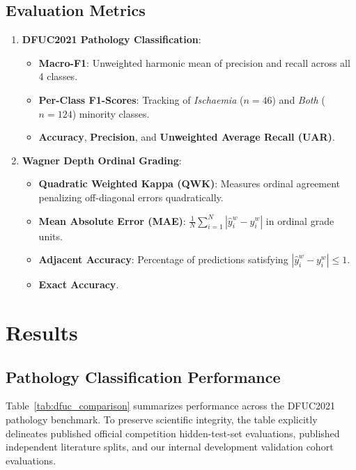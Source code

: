 \documentclass[journal]{IEEEtran}
\begin{document}
\subsection{Evaluation Metrics}
\begin{enumerate}
    \item \textbf{DFUC2021 Pathology Classification}:
    \begin{itemize}
        \item \textbf{Macro-F1}: Unweighted harmonic mean of precision and recall across all 4 classes.
        \item \textbf{Per-Class F1-Scores}: Tracking of \textit{Ischaemia} ($n = 46$) and \textit{Both} ($n = 124$) minority classes.
        \item \textbf{Accuracy}, \textbf{Precision}, and \textbf{Unweighted Average Recall (UAR)}.
    \end{itemize}
    \item \textbf{Wagner Depth Ordinal Grading}:
    \begin{itemize}
        \item \textbf{Quadratic Weighted Kappa (QWK)}: Measures ordinal agreement penalizing off-diagonal errors quadratically.
        \item \textbf{Mean Absolute Error (MAE)}: $\frac{1}{N} \sum_{i=1}^N |\hat{y}_i^w - y_i^w|$ in ordinal grade units.
        \item \textbf{Adjacent Accuracy}: Percentage of predictions satisfying $|\hat{y}_i^w - y_i^w| \le 1$.
        \item \textbf{Exact Accuracy}.
    \end{itemize}
\end{enumerate}

\section{Results}

\subsection{Pathology Classification Performance}
Table~\ref{tab:dfuc_comparison} summarizes performance across the DFUC2021 pathology benchmark. To preserve scientific integrity, the table explicitly delineates published official competition hidden-test-set evaluations, published independent literature splits, and our internal development validation cohort evaluations.
\end{document}
